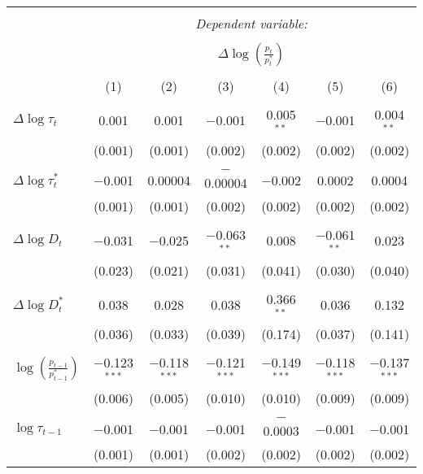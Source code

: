 
\begin{tabular}{@{\extracolsep{5pt}}lcccccc} 
\\[-1.8ex]\hline 
\hline \\[-1.8ex] 
 & \multicolumn{6}{c}{\textit{Dependent variable:}} \\ 
\cline{2-7} 
\\[-1.8ex] & \multicolumn{6}{c}{$\Delta \log \left(\frac{p_t}{p_t^*} \right)$} \\ 
\\[-1.8ex] & (1) & (2) & (3) & (4) & (5) & (6)\\ 
\hline \\[-1.8ex] 
 $\Delta \log \tau_t$ & 0.001 & 0.001 & $-$0.001 & 0.005$^{**}$ & $-$0.001 & 0.004$^{**}$ \\ 
  & (0.001) & (0.001) & (0.002) & (0.002) & (0.002) & (0.002) \\ 
  & & & & & & \\ 
 $\Delta \log \tau_t^*$ & $-$0.001 & 0.00004 & $-$0.00004 & $-$0.002 & 0.0002 & 0.0004 \\ 
  & (0.001) & (0.001) & (0.002) & (0.002) & (0.002) & (0.002) \\ 
  & & & & & & \\ 
 $\Delta \log D_t$ & $-$0.031 & $-$0.025 & $-$0.063$^{**}$ & 0.008 & $-$0.061$^{**}$ & 0.023 \\ 
  & (0.023) & (0.021) & (0.031) & (0.041) & (0.030) & (0.040) \\ 
  & & & & & & \\ 
 $\Delta \log D_t^*$ & 0.038 & 0.028 & 0.038 & 0.366$^{**}$ & 0.036 & 0.132 \\ 
  & (0.036) & (0.033) & (0.039) & (0.174) & (0.037) & (0.141) \\ 
  & & & & & & \\ 
 $\log \left(\frac{p_{t-1}}{p_{t-1}^*} \right)$ & $-$0.123$^{***}$ & $-$0.118$^{***}$ & $-$0.121$^{***}$ & $-$0.149$^{***}$ & $-$0.118$^{***}$ & $-$0.137$^{***}$ \\ 
  & (0.006) & (0.005) & (0.010) & (0.010) & (0.009) & (0.009) \\ 
  & & & & & & \\ 
 $\log \tau_{t-1}$ & $-$0.001 & $-$0.001 & $-$0.001 & $-$0.0003 & $-$0.001 & $-$0.001 \\ 
  & (0.001) & (0.001) & (0.002) & (0.002) & (0.002) & (0.002) \\ 

\end{tabular}
